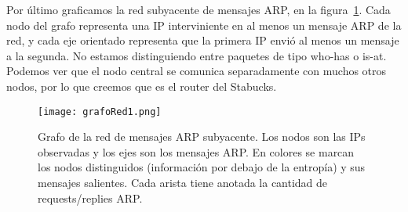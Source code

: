 Por último graficamos la red subyacente de mensajes ARP, en la figura~\ref{grafo1}. Cada nodo del grafo representa una IP interviniente en al menos un mensaje ARP de la red, y cada eje orientado representa que la primera IP envió al menos un mensaje a la segunda. No estamos distinguiendo entre paquetes de tipo who-has o is-at. Podemos ver que el nodo central se comunica separadamente con muchos otros nodos, por lo que creemos que es el router del Stabucks.

\begin{figure}[H]
\centering
\texttt{[image: grafoRed1.png]}
\caption{Grafo de la red de mensajes ARP subyacente. Los nodos son las IPs observadas y los ejes son los mensajes ARP. En colores se marcan los nodos distinguidos (información por debajo de la entropía) y sus mensajes salientes. Cada arista tiene anotada la cantidad de requests/replies ARP.}
\label{grafo1}
\end{figure}

